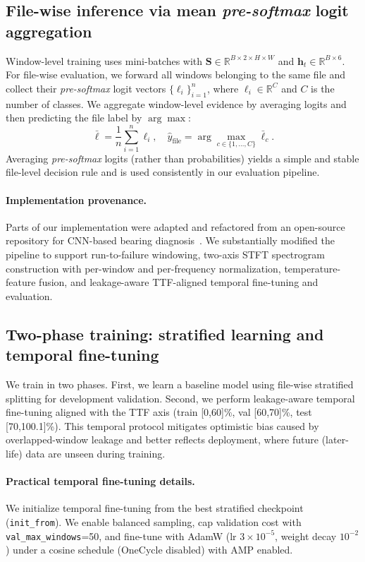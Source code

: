 \documentclass{article}
\begin{document}
\subsection{File-wise inference via mean \emph{pre-softmax} logit aggregation}
\label{sec:filewise}

Window-level training uses mini-batches with $\mathbf{S}\in\mathbb{R}^{B\times2\times H\times W}$ and $\mathbf{h}_t\in\mathbb{R}^{B\times6}$. 
For file-wise evaluation, we forward all windows belonging to the same file and collect their \emph{pre-softmax} logit vectors $\{\boldsymbol{\ell}_i\}_{i=1}^{n}$, where $\boldsymbol{\ell}_i\in\mathbb{R}^{C}$ and $C$ is the number of classes. 
We aggregate window-level evidence by averaging logits and then predicting the file label by $\arg\max$:
\begin{equation}
\bar{\boldsymbol{\ell}} = \frac{1}{n}\sum_{i=1}^{n}\boldsymbol{\ell}_i,\quad
\hat{y}_{\text{file}}=\arg\max_{c \in \{1,\dots,C\}} \bar{\ell}_c.
\end{equation}
Averaging \emph{pre-softmax} logits (rather than probabilities) yields a simple and stable file-level decision rule and is used consistently in our evaluation pipeline.
\paragraph{Implementation provenance.}

Parts of our implementation were adapted and refactored from an open-source repository for CNN-based bearing diagnosis~\cite{mdzalfirdausi_paderborn_repo}. We substantially modified the pipeline to support run-to-failure windowing, two-axis STFT spectrogram construction with per-window and per-frequency normalization, temperature-feature fusion, and leakage-aware TTF-aligned temporal fine-tuning and evaluation.
\subsection{Two-phase training: stratified learning and temporal fine-tuning}
We train in two phases. First, we learn a baseline model using file-wise stratified splitting for development validation. Second, we perform leakage-aware temporal fine-tuning aligned with the TTF axis (train [0,60]\%, val [60,70]\%, test [70,100.1]\%). This temporal protocol mitigates optimistic bias caused by overlapped-window leakage and better reflects deployment, where future (later-life) data are unseen during training.
\paragraph{Practical temporal fine-tuning details.}
We initialize temporal fine-tuning from the best stratified checkpoint (\texttt{init\_from}). We enable balanced sampling, cap validation cost with \texttt{val\_max\_windows}=50, and fine-tune with AdamW (lr $3\times10^{-5}$, weight decay $10^{-2}$) under a cosine schedule (OneCycle disabled) with AMP enabled.
\end{document}
